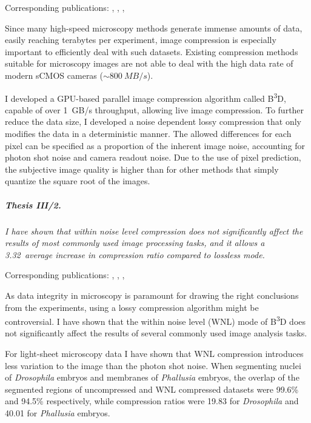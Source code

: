\documentclass{booklet_style}
\def\b3d{B\textsuperscript{3}D}
\begin{document}
    Corresponding publications: \cite{balazs_real-time_2017}, \cite{balazs_gpu-based_2016}, \cite{balazs_gpu-based_2016-1}, \cite{balazs_gpu-based_2017}
    
    Since many high-speed microscopy methods generate immense amounts of data, easily reaching terabytes per experiment, image compression is especially important to efficiently deal with such datasets. Existing compression methods suitable for microscopy images are not able to deal with the high data rate of modern sCMOS cameras ($\sim \SI{800}{MB/s}$).

    I developed a GPU-based parallel image compression algorithm called \b3d, capable of over \SI{1}{GB/s} throughput, allowing live image compression. To further reduce the data size, I developed a noise dependent lossy compression that only modifies the data in a deterministic manner. The allowed differences for each pixel can be specified as a proportion of the inherent image noise, accounting for photon shot noise and camera readout noise. Due to the use of pixel prediction, the subjective image quality is higher than for other methods that simply quantize the square root of the images.


  \subparagraph{Thesis III/2.} \textit{I have shown that within noise level compression does not significantly affect the results of most commonly used image processing tasks, and it allows a 3.32\texttimes\ average increase in compression ratio compared to lossless mode.}
  
    Corresponding publications: \cite{balazs_real-time_2017}, \cite{balazs_gpu-based_2016}, \cite{balazs_gpu-based_2016-1}, \cite{balazs_gpu-based_2017}
    
    As data integrity in microscopy is paramount for drawing the right conclusions from the experiments, using a lossy compression algorithm might be controversial.
    I have shown that the within noise level (WNL) mode of \b3d does not significantly affect the results of several commonly used image analysis tasks.
    
    For light-sheet microscopy data I have shown that WNL compression introduces less variation to the image than the photon shot noise. When segmenting nuclei of \textit{Drosophila} embryos and membranes of \textit{Phallusia} embryos, the overlap of the segmented regions of uncompressed and WNL compressed datasets were 99.6\% and 94.5\% respectively, while compression ratios were 19.83 for \textit{Drosophila} and 40.01 for \textit{Phallusia} embryos.
\end{document}
